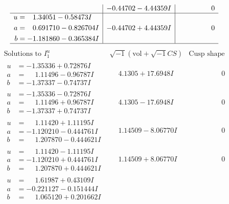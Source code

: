 \documentclass[1p]{elsarticle_modified}
\theoremstyle{definition}
\newcommand{\I}{\sqrt{-1}}
\begin{document}
$$\begin{array}{c|c|c}
 & -0.44702 - 4.44359 I & \phantom{-0.000000 } 0 \\ \hline\begin{aligned}
u &= \phantom{-}1.34051 - 0.58473 I \\
a &= \phantom{-}0.691710 - 0.826704 I \\
b &= -1.181860 - 0.365384 I\end{aligned}
 & -0.44702 + 4.44359 I & \phantom{-0.000000 } 0\\
 \hline 
 \end{array}$$\newpage$$\begin{array}{c|c|c}  
\text{Solutions to }I^u_{1}& \I (\text{vol} + \sqrt{-1}CS) & \text{Cusp shape}\\
 \hline 
\begin{aligned}
u &= -1.35336 + 0.72876 I \\
a &= \phantom{-}1.11496 - 0.96787 I \\
b &= -1.37337 - 0.74737 I\end{aligned}
 & \phantom{-}4.1305 + 17.6948 I & \phantom{-0.000000 } 0 \\ \hline\begin{aligned}
u &= -1.35336 - 0.72876 I \\
a &= \phantom{-}1.11496 + 0.96787 I \\
b &= -1.37337 + 0.74737 I\end{aligned}
 & \phantom{-}4.1305 - 17.6948 I & \phantom{-0.000000 } 0 \\ \hline\begin{aligned}
u &= \phantom{-}1.11420 + 1.11195 I \\
a &= -1.120210 - 0.444761 I \\
b &= \phantom{-}1.207870 - 0.444621 I\end{aligned}
 & \phantom{-}1.14509 - 8.06770 I & \phantom{-0.000000 } 0 \\ \hline\begin{aligned}
u &= \phantom{-}1.11420 - 1.11195 I \\
a &= -1.120210 + 0.444761 I \\
b &= \phantom{-}1.207870 + 0.444621 I\end{aligned}
 & \phantom{-}1.14509 + 8.06770 I & \phantom{-0.000000 } 0 \\ \hline\begin{aligned}
u &= \phantom{-}1.61987 + 0.43109 I \\
a &= -0.221127 - 0.151444 I \\
b &= \phantom{-}1.065120 + 0.201662 I\end{aligned}

\end{array}$$
\end{document}

